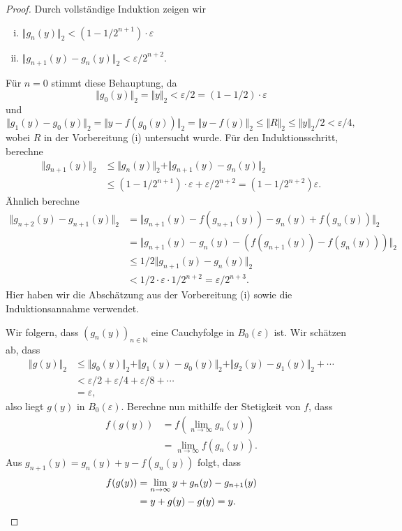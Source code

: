 \documentclass[../main.tex]{subfiles}
\begin{document}
\begin{proof}
  Durch vollständige Induktion zeigen wir
  \begin{enumerate}[(i)]
    \item $\Vert g_n(y) \Vert_2 < (1 - 1/2^{n+1}) \cdot \varepsilon$
    \item $\Vert g_{n+1}(y) - g_n(y) \Vert_2 < \varepsilon / 2^{n+2}$.
  \end{enumerate}
  Für $n = 0$ stimmt diese Behauptung, da
  \[
    \Vert g_0(y) \Vert_2 = \Vert y \Vert_2 < \varepsilon / 2 = (1 - 1/2)
    \cdot \varepsilon
  \]
  und
  \[
    \Vert g_1(y) - g_0(y) \Vert_2 = \Vert y - f ( g_0(y)) \Vert_2
    = \Vert y - f(y) \Vert_2 \leq \Vert R \Vert_2
    \leq \Vert y \Vert_2 / 2 < \varepsilon / 4,
  \]
  wobei $R$ in der Vorbereitung (i) untersucht wurde.
  Für den Induktionsschritt, berechne
  \begin{align*}
    \Vert g_{n+1}(y) \Vert_2
    &\leq  \Vert g_n(y) \Vert_2 + \Vert g_{n+1}(y) - g_n(y) \Vert_2 \\
    &\leq (1 - 1/2^{n+1}) \cdot \varepsilon
    + \varepsilon / 2^{n+2} = (1 - 1/2^{n+2}) \varepsilon.
  \end{align*}
  Ähnlich berechne
  \begin{align*}
    \Vert g_{n+2}(y) - g_{n+1}(y) \Vert_2
    &= \Vert g_{n+1}(y) - f(g_{n+1}(y)) - g_n(y) + f(g_n(y)) \Vert_2  \\
    &= \Vert g_{n+1}(y) - g_n(y) - (f(g_{n+1}(y)) - f(g_n(y))) \Vert_2 \\
    &\leq 1/2 \Vert g_{n+1}(y) - g_n(y) \Vert_2 \\
    &< 1/2 \cdot \varepsilon \cdot 1/2^{n+2} = \varepsilon/2^{n+3}.
  \end{align*}
  Hier haben wir die Abschätzung aus der Vorbereitung (i)
  sowie die Induktionsannahme verwendet.

  Wir folgern, dass $(g_n(y))_{n \in \mathbb{N}}$ eine Cauchyfolge in
  $B_0(\varepsilon)$ ist.
  Wir schätzen ab, dass
  \begin{align*}
    \Vert g(y) \Vert_2
    & \leq \Vert g_0(y) \Vert_2 +
    \Vert g_1(y) - g_0(y) \Vert_2
    + \Vert g_2(y) - g_1(y) \Vert_2 + \cdots \\
    &< \varepsilon/2 + \varepsilon/4 + \varepsilon/8 + \cdots \\
    &= \varepsilon,
  \end{align*}
  also liegt $g(y)$ in $B_0(\varepsilon)$.
  Berechne nun mithilfe der Stetigkeit von $f$, dass
  \begin{align*}
    f(g(y))
    & = f \left( \lim_{n \to \infty}g_n(y) \right)\\
    &= \lim_{n \to \infty} f(g_n(y)).
  \end{align*}
  Aus $g_{n+1}(y) = g_n(y) + y - f(g_n(y))$ folgt, dass
  \begin{align*}
    f(g(y))
    &= \lim_{n \to \infty} y + g_n(y) - g_{n+1}(y)  \\
    &= y + g(y) - g(y) = y. \qedhere
  \end{align*}
\end{proof}
\end{document}
